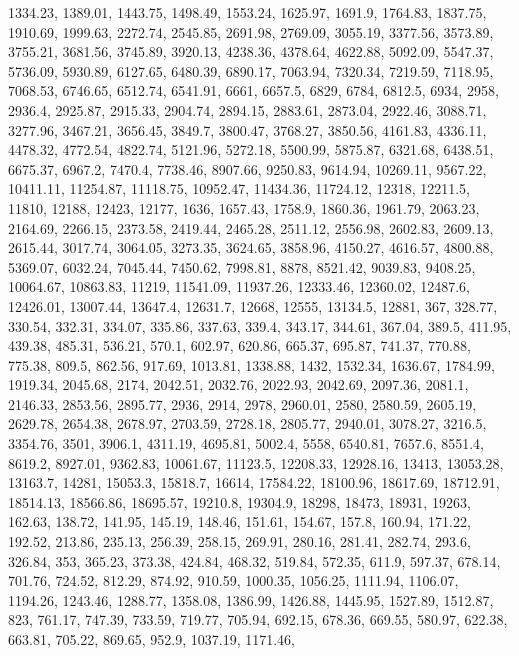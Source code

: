 \documentclass[
]{article}
\begin{document}
1334.23, 1389.01, 1443.75, 1498.49, 1553.24, 1625.97, 1691.9, 1764.83,
1837.75, 1910.69, 1999.63, 2272.74, 2545.85, 2691.98, 2769.09, 3055.19,
3377.56, 3573.89, 3755.21, 3681.56, 3745.89, 3920.13, 4238.36, 4378.64,
4622.88, 5092.09, 5547.37, 5736.09, 5930.89, 6127.65, 6480.39, 6890.17,
7063.94, 7320.34, 7219.59, 7118.95, 7068.53, 6746.65, 6512.74, 6541.91,
6661, 6657.5, 6829, 6784, 6812.5, 6934, 2958, 2936.4, 2925.87, 2915.33,
2904.74, 2894.15, 2883.61, 2873.04, 2922.46, 3088.71, 3277.96, 3467.21,
3656.45, 3849.7, 3800.47, 3768.27, 3850.56, 4161.83, 4336.11, 4478.32,
4772.54, 4822.74, 5121.96, 5272.18, 5500.99, 5875.87, 6321.68, 6438.51,
6675.37, 6967.2, 7470.4, 7738.46, 8907.66, 9250.83, 9614.94, 10269.11,
9567.22, 10411.11, 11254.87, 11118.75, 10952.47, 11434.36, 11724.12,
12318, 12211.5, 11810, 12188, 12423, 12177, 1636, 1657.43, 1758.9,
1860.36, 1961.79, 2063.23, 2164.69, 2266.15, 2373.58, 2419.44, 2465.28,
2511.12, 2556.98, 2602.83, 2609.13, 2615.44, 3017.74, 3064.05, 3273.35,
3624.65, 3858.96, 4150.27, 4616.57, 4800.88, 5369.07, 6032.24, 7045.44,
7450.62, 7998.81, 8878, 8521.42, 9039.83, 9408.25, 10064.67, 10863.83,
11219, 11541.09, 11937.26, 12333.46, 12360.02, 12487.6, 12426.01,
13007.44, 13647.4, 12631.7, 12668, 12555, 13134.5, 12881, 367, 328.77,
330.54, 332.31, 334.07, 335.86, 337.63, 339.4, 343.17, 344.61, 367.04,
389.5, 411.95, 439.38, 485.31, 536.21, 570.1, 602.97, 620.86, 665.37,
695.87, 741.37, 770.88, 775.38, 809.5, 862.56, 917.69, 1013.81, 1338.88,
1432, 1532.34, 1636.67, 1784.99, 1919.34, 2045.68, 2174, 2042.51,
2032.76, 2022.93, 2042.69, 2097.36, 2081.1, 2146.33, 2853.56, 2895.77,
2936, 2914, 2978, 2960.01, 2580, 2580.59, 2605.19, 2629.78, 2654.38,
2678.97, 2703.59, 2728.18, 2805.77, 2940.01, 3078.27, 3216.5, 3354.76,
3501, 3906.1, 4311.19, 4695.81, 5002.4, 5558, 6540.81, 7657.6, 8551.4,
8619.2, 8927.01, 9362.83, 10061.67, 11123.5, 12208.33, 12928.16, 13413,
13053.28, 13163.7, 14281, 15053.3, 15818.7, 16614, 17584.22, 18100.96,
18617.69, 18712.91, 18514.13, 18566.86, 18695.57, 19210.8, 19304.9,
18298, 18473, 18931, 19263, 162.63, 138.72, 141.95, 145.19, 148.46,
151.61, 154.67, 157.8, 160.94, 171.22, 192.52, 213.86, 235.13, 256.39,
258.15, 269.91, 280.16, 281.41, 282.74, 293.6, 326.84, 353, 365.23,
373.38, 424.84, 468.32, 519.84, 572.35, 611.9, 597.37, 678.14, 701.76,
724.52, 812.29, 874.92, 910.59, 1000.35, 1056.25, 1111.94, 1106.07,
1194.26, 1243.46, 1288.77, 1358.08, 1386.99, 1426.88, 1445.95, 1527.89,
1512.87, 823, 761.17, 747.39, 733.59, 719.77, 705.94, 692.15, 678.36,
669.55, 580.97, 622.38, 663.81, 705.22, 869.65, 952.9, 1037.19, 1171.46,
\end{document}
